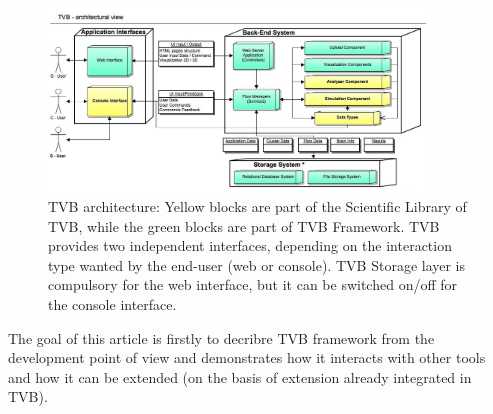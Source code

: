  \begin{figure}
        \centering
        \includegraphics[width=0.90\textwidth]{images/architecture.jpg}
        \caption{TVB architecture: Yellow blocks are part of the Scientific
            Library of TVB, while the green blocks are part of TVB Framework.
            TVB provides two independent interfaces, depending on the
            interaction type wanted by the end-user (web or console).  TVB
            Storage layer is compulsory for the web interface, but it can be
            switched on/off for the console interface.  
         }
        \label{fig:architecture}
 \end{figure}

 The goal of this article is firstly to decribre TVB framework from the
 development point of view and demonstrates how it interacts with other tools
 and how it can be extended (on the basis of extension already integrated in
 TVB).
